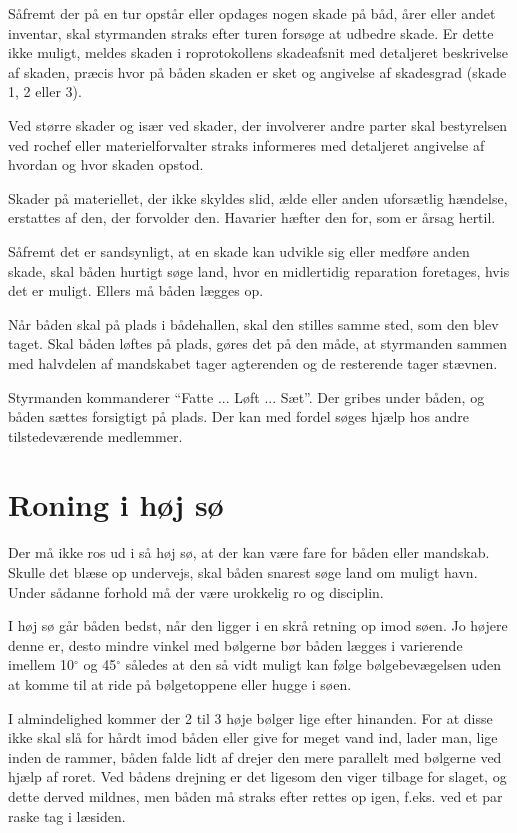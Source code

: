 \documentclass{article}
\begin{document}
Såfremt der på en tur opstår eller opdages nogen skade på båd, årer eller
andet inventar, skal styrmanden straks efter turen forsøge at udbedre
skade. Er dette ikke muligt, meldes skaden i roprotokollens skadeafsnit
med detaljeret beskrivelse af skaden, præcis hvor på båden skaden er sket
og angivelse af skadesgrad (skade 1, 2 eller 3).

Ved større skader og især ved skader, der involverer andre parter skal
bestyrelsen ved rochef eller materielforvalter straks informeres med
detaljeret angivelse af hvordan og hvor skaden opstod.

Skader på materiellet, der ikke skyldes slid, ælde eller anden uforsætlig
hændelse, erstattes af den, der forvolder den. Havarier hæfter den for,
som er årsag hertil.

Såfremt det er sandsynligt, at en skade kan udvikle sig eller medføre
anden skade, skal båden hurtigt søge land, hvor en midlertidig reparation
foretages, hvis det er muligt. Ellers må båden lægges op.

Når båden skal på plads i bådehallen, skal den stilles samme sted, som
den blev taget. Skal båden løftes på plads, gøres det på den måde, at
styrmanden sammen med halvdelen af mandskabet tager agterenden og de
resterende tager stævnen.

Styrmanden kommanderer ``Fatte ... Løft ... Sæt''. Der gribes under
båden, og båden sættes forsigtigt på plads. Der kan med fordel søges
hjælp hos andre tilstedeværende medlemmer.

\section{Roning i høj sø}

Der må ikke ros ud i så høj sø, at der kan være fare for båden eller
mandskab. Skulle det blæse op undervejs, skal båden snarest søge land om
muligt havn. Under sådanne forhold må der være urokkelig ro og disciplin.

I høj sø går båden bedst, når den ligger i en skrå retning op imod søen.
Jo højere denne er, desto mindre vinkel med bølgerne bør båden lægges i
varierende imellem 10$^\circ$ og 45$^\circ$ således at den så vidt muligt
kan følge bølgebevægelsen uden at komme til at ride på bølgetoppene eller
hugge i søen.

I almindelighed kommer der 2 til 3 høje bølger lige efter hinanden. For
at disse ikke skal slå for hårdt imod båden eller give for meget vand
ind, lader man, lige inden de rammer, båden falde lidt af drejer den mere
parallelt med bølgerne ved hjælp af roret. Ved bådens drejning er det
ligesom den viger tilbage for slaget, og dette derved mildnes, men båden
må straks efter rettes op igen, f.eks. ved et par raske tag i læsiden.
\end{document}

